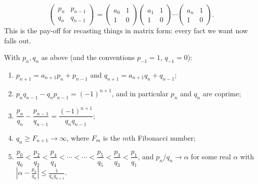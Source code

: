 $$\begin{pmatrix}p_n&p_{n-1}\\q_n&q_{n-1}\end{pmatrix} = \begin{pmatrix}a_0&1\\1&0\end{pmatrix}\begin{pmatrix}a_1&1\\1&0\end{pmatrix}\cdots\begin{pmatrix}a_n&1\\1&0\end{pmatrix}.$$
This is the pay-off for recasting things in matrix form: every fact we want now falls out.

\begin{theorem}\label{thm:convergent-facts}
	With $p_n, q_n$ as above (and the conventions $p_{-1}=1$, $q_{-1}=0$):
	\begin{enumerate}[label=(\roman*)]
		\item $p_{n+1} = a_{n+1}p_n+p_{n-1}$ and $q_{n+1}=a_{n+1}q_n+q_{n-1}$;
		\item $p_nq_{n-1}-q_np_{n-1} = (-1)^{n+1}$, and in particular $p_n$ and $q_n$ are coprime;
		\item $\dfrac{p_n}{q_n}-\dfrac{p_{n-1}}{q_{n-1}} = \dfrac{(-1)^{n+1}}{q_nq_{n-1}}$;
		\item $q_n \geq F_{n+1}\to\infty$, where $F_m$ is the $m$th Fibonacci number;
		\item $\dfrac{p_0}{q_0}<\dfrac{p_2}{q_2}<\dfrac{p_4}{q_4}<\cdots<\cdots<\dfrac{p_5}{q_5}<\dfrac{p_3}{q_3}<\dfrac{p_1}{q_1}$, and $p_n/q_n \to \alpha$ for some real $\alpha$ with $\left|\alpha - \frac{p_n}{q_n}\right| \leq \frac{1}{q_nq_{n+1}}$.
	\end{enumerate}
\end{theorem}

